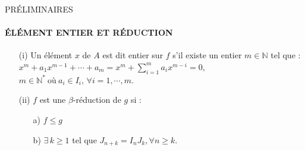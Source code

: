 \documentclass[11pt,a4paper]{beamer}
\begin{document}
%	
	\begin{frame}{PRÉLIMINAIRES}
		\framesubtitle{ÉLÉMENT ENTIER ET RÉDUCTION}
		\begin{block}{}
			\begin{enumerate}
				\item[(i)] Un élément $x$ de $A$ est dit entier sur $f$ s'il existe un entier $m \in \mathbb{N}$ tel que : $x^m + a_1 x^{m-1} + \cdots + a_m = x^m + \sum_{i=1}^{m} a_i x^{m-i} = 0,$\\$ m \in \mathbb{N^*} \ \text{où} \ a_i \in I_i,\, \forall i=1, \cdots ,m.$
				\item[(ii)] $f$ est une $\beta$-réduction de $g$ si : \\
				\begin{enumerate}
					\item[a)] $f \leq g$
					\item[b)]  $\exists \, k \geq 1$ tel que $J_{n+k} = I_n J_k , \forall n \geq k$.
				\end{enumerate}
			\end{enumerate}
		\end{block}
	\end{frame}
	
\end{document}
